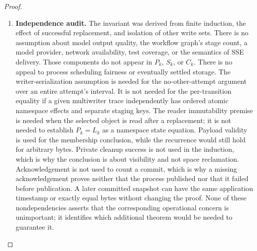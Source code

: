 \documentclass[12pt]{article}
\begin{document}
\begin{proof}
\begin{enumerate}
\item \textbf{Independence audit.}
The invariant was derived from finite induction, the effect
of successful replacement, and isolation of other write sets.
There is no assumption about model output quality, the workflow
graph's stage count, a model provider, network availability,
test coverage, or the semantics of SSE delivery.
Those components do not appear in $P_k$, $S_k$, or $C_k$.
There is no appeal to process scheduling fairness or eventually
settled storage.
The writer-serialization assumption is needed for the
no-other-attempt argument over an entire attempt's interval.
It is not needed for the per-transition equality if a given
multiwriter trace independently has ordered atomic namespace
effects and separate staging keys.
The reader immutability premise is needed when the selected
object is read after a replacement; it is not needed to
establish $P_k=L_k$ as a namespace state equation.
Payload validity is used for the membership conclusion,
while the recurrence would still hold for arbitrary bytes.
Private cleanup success is not used in the induction,
which is why the conclusion is about visibility and not
space reclamation.
Acknowledgement is not used to count a commit,
which is why a missing acknowledgement proves neither
that the process published nor that it failed before publication.
A later committed snapshot can have the same application
timestamp or exactly equal bytes without changing the proof.
None of these nondependencies asserts that the corresponding
operational concern is unimportant; it identifies which
additional theorem would be needed to guarantee it.


\end{enumerate}
\end{proof}
\end{document}
